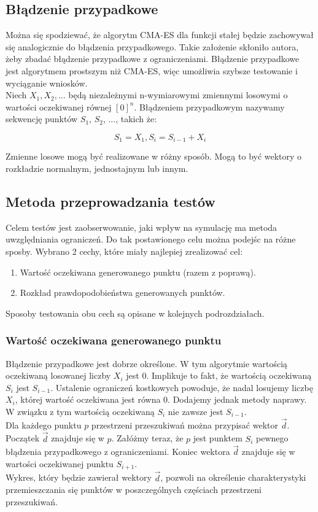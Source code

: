\documentclass{mini}
\begin{document}
\subsection{Błądzenie przypadkowe} \label{bladzenie}

Można się spodziewać, że algorytm CMA-ES dla funkcji stałej będzie zachowywał się analogicznie do błądzenia przypadkowego. Takie założenie skłoniło autora, żeby zbadać błądzenie przypadkowe z ograniczeniami. Błądzenie przypadkowe jest algorytmem prostszym niż CMA-ES, więc umożliwia szybsze testowanie i wyciąganie wniosków.\\
Niech $ X_1, X_2, ... $ będą niezależnymi n-wymiarowymi zmiennymi losowymi o wartości oczekiwanej równej $ [0]^n $. Błądzeniem przypadkowym nazywamy sekwencję punktów $S_1$, $S_2$, ..., takich że:

\begin{equation}
S_1 = X_1, S_i=S_{i-1}+X_i
\end{equation}

Zmienne losowe mogą być realizowane w różny sposób. Mogą to być wektory o rozkładzie normalnym, jednostajnym lub innym.

\subsection{Metoda przeprowadzania testów}
Celem testów jest zaobserwowanie, jaki wpływ na symulację ma metoda uwzględniania ograniczeń. Do tak postawionego celu można podejśc na różne sposby. Wybrano 2 cechy, które miały najlepiej zrealizować cel:
\begin{enumerate}
\item Wartość oczekiwana generowanego punktu (razem z poprawą).
\item Rozkład prawdopodobieństwa generowanych punktów.
\end{enumerate}

Sposoby testowania obu cech są opisane w kolejnych podrozdziałach.

\subsubsection{Wartość oczekiwana generowanego punktu}
Błądzenie przypadkowe jest dobrze określone. W tym algorytmie wartością oczekiwaną losowanej liczby $X_i$ jest 0. Implikuje to fakt, że wartością oczekiwaną $S_i$ jest $S_{i-1}$. Ustalenie ograniczeń kostkowych powoduje, że nadal losujemy liczbę $X_i$, której wartość oczekiwana jest równa 0. Dodajemy jednak metody naprawy. W związku z tym wartością oczekiwaną $S_i$ nie zawsze jest $S_{i-1}$.\\
Dla każdego punktu $p$ przestrzeni przeszukiwań można przypisać wektor $\overrightarrow{d}$. Początek $\overrightarrow{d}$ znajduje się w $p$. Załóżmy teraz, że $p$ jest punktem $S_i$ pewnego błądzenia przypadkowego z ograniczeniami. Koniec wektora $\overrightarrow{d}$ znajduje się w wartości oczekiwanej punktu $S_{i+1}$.\\
Wykres, który będzie zawierał wektory $\overrightarrow{d}$, pozwoli na określenie charakterystyki przemieszczania się punktów w poszczególnych częściach przestrzeni przeszukiwań.\\
\end{document}
